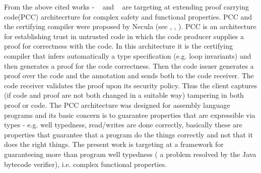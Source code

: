 From the above cited works - ~\cite{WildmoserN-ESOP05} and ~\cite{BM05plb} are targeting at extending proof carrying code(PCC) architecrture for complex safety and functional properties. PCC and the certifying compiler were proposed by Necula (see \cite{Necula97}, \cite{ComNec}, \cite{DesNecLee98}). PCC is an architecture for establishing trust in untrusted code in which the code producer supplies a proof for correctness with the code. In this architecture it is the certifying compiler that infers automatically a type specification (e.g. loop invariants) and then generates a proof for the code correctness. Then the code issuer generates a proof over the code and the annotation and sends both to the code receiver. The code receiver validates the proof upon its security policy. Thus the client captures (if code and proof are not both changed in a suitable way) tampering in both proof or code. The PCC architecture was designed for assembly language programs and its basic concern is to guarantee properties that are expressible via types - e.g. well typedness, read/writes are done correctly, basically these are properties that guarantee that a program do the things correctly and not that it does the right things. The present work is targeting at a framework for guaranteeing more than program well typedness ( a problem resolved by the Java bytecode verifier), i.e. complex functional properties. 
